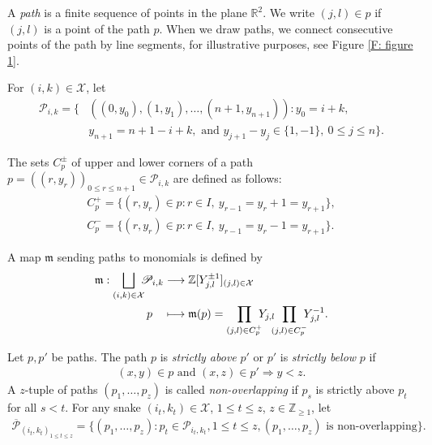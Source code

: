 \documentclass[11pt, reqno]{amsart}
\theoremstyle{plain}
\theoremstyle{definition}
\numberwithin{equation}{section}
\begin{document}
A \textit{path} is a finite sequence of points in the plane $\mathbb{R}^{2}$. We write $(j,l) \in p$ if $(j,l)$ is a point of the path $p$. When we draw paths, we connect consecutive points of the path by line segments, for illustrative purposes, see Figure \ref{F: figure 1}.

For $(i,k) \in \mathcal{X}$, let
\begin{align}\label{path}
\mathscr{P}_{i,k}=\{ & ((0,y_{0}),(1,y_{1}),\ldots,(n+1,y_{n+1})): y_{0}=i+k, \nonumber \\
&y_{n+1}=n+1-i+k, \text{ and } y_{j+1}-y_{j}\in \{1,-1\}, \  0\leq j\leq n\}.
\end{align}

The sets $C_{p}^{\pm}$ of upper and lower corners of a path $p=((r,y_{r}))_{0\leq r \leq n+1}\in \mathscr{P}_{i,k}$ are defined as follows:
\begin{align*}
C^{+}_{p}=\{(r,y_{r})\in p: r\in I, \ y_{r-1}=y_{r}+1=y_{r+1}\},\\
C^{-}_{p}=\{(r,y_{r})\in p: r\in I, \ y_{r-1}=y_{r}-1=y_{r+1}\}.
\end{align*}

A map $\mathfrak{m}$ sending paths to monomials is defined by
\begin{align}\label{map: path to monomial}
\mathfrak{m}: \bigsqcup_{(i,k)\in \mathcal{X}}{\hskip -0.5em}\mathscr{P}_{i,k} & \longrightarrow \mathbb{Z}[Y_{j,l}^{\pm 1}]_{(j,l)\in \mathcal{X}} \nonumber \\
p\quad & \longmapsto  \mathfrak{m}(p)=\prod_{(j,l)\in C^{+}_{p}}{\hskip -0.5em}Y_{j,l}{\hskip -0.5em}\prod_{(j,l)\in C^{-}_{p}}{\hskip -0.5em}Y_{j,l}^{-1}.
\end{align}

Let $p, p'$ be paths. The path $p$ is \textit{strictly above} $p'$ or $p'$ is \textit{strictly below} $p$ if
\begin{align*}
(x,y)\in p \text{ and } (x,z)\in p' \Longrightarrow y < z.
\end{align*}
A $z$-tuple of paths $(p_{1},\ldots,p_{z})$ is called \textit{non-overlapping} if $p_{s}$ is strictly above $p_{t}$ for all $s<t$. For any snake $(i_{t},k_{t})\in \mathcal{X}$, $1\leq t\leq z$, $z\in \mathbb{Z}_{\geq1}$, let
\begin{align}\label{Non-overlapping paths}
\overline{\mathscr{P}}_{(i_{t},k_{t})_{1\leq t\leq z}}=\{(p_{1},\ldots,p_{z}): p_{t}\in \mathscr{P}_{i_{t},k_{t}}, 1\leq t\leq z, (p_{1},\ldots,p_{z})\text{ is } \text {non-overlapping}\}.
\end{align}
\end{document}
